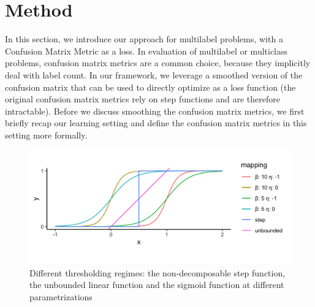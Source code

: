 
\section{Method}
\label{sec:orga8a42f5}
\label{section:method}

In this section, we introduce our approach for multilabel problems, with a Confusion Matrix Metric as a loss. In evaluation of multilabel or multiclass problems, confusion matrix metrics are a common choice, because they implicitly deal with label count. In our framework, we leverage a smoothed version of the confusion matrix that can be used to directly optimize as a loss function (the original confusion matrix metrics rely on step functions and are therefore intractable). Before we discuss smoothing the confusion matrix metrics, we first briefly recap our learning setting and define the confusion matrix metrics in this setting more formally.

\begin{figure}[tbp]
\centering
\includegraphics[width=\linewidth]{./images/sigmoid.png}
\caption{\label{fig:sigmoid}
Different thresholding regimes: the non-decomposable step function, the unbounded linear function and the sigmoid function at different parametrizations}
\end{figure}
\label{fig:sigmoid}



